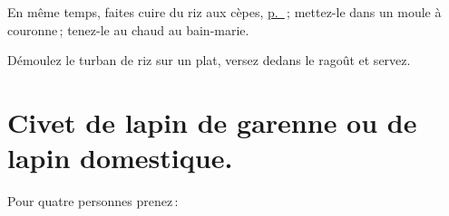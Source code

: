 En même temps, faites cuire du riz aux cèpes,
\hyperlink{p0708-1}{p. \pageref{pg0708-1}} ; mettez-le dans un moule à couronne ;
tenez-le au chaud au bain-marie.

Démoulez le turban de riz sur un plat, versez dedans le ragoût et servez.

\section*{\centering Civet de lapin de garenne ou de lapin domestique.}
{}

Pour quatre personnes prenez :

\footnotesize
